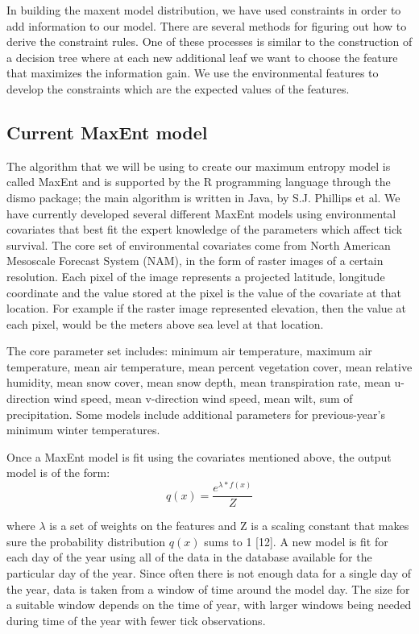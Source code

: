 \noindent In building the maxent model distribution, we have used constraints in order to add information to our model. There are several methods for figuring out how to derive the constraint rules. One of these processes is similar to the construction of a decision tree where at each new additional leaf we want to choose the feature that maximizes the information gain. We use the environmental features to develop the constraints which are the expected values of the features.\newline

\subsection{Current MaxEnt model}

\noindent The algorithm that we will be using to create our maximum entropy model is called MaxEnt and is supported by the R programming language through the dismo package; the main algorithm is written in Java, by S.J. Phillips et al. We have currently developed several different MaxEnt models using environmental covariates that best fit the expert knowledge of the parameters which affect tick survival. The core set of environmental covariates come from North American Mesoscale Forecast System (NAM), in the form of raster images of a certain resolution. Each pixel of the image represents a projected latitude, longitude coordinate and the value stored at the pixel is the value of the covariate at that location. For example if the raster image represented elevation, then the value at each pixel, would be the meters above sea level at that location. \newline

\noindent The core parameter set includes: minimum air temperature, maximum air temperature, mean air temperature, mean percent vegetation cover, mean relative humidity, mean snow cover, mean snow depth, mean transpiration rate, mean u-direction wind speed, mean v-direction wind speed, mean wilt, sum of precipitation. Some models include additional parameters for previous-year's minimum winter temperatures.  \newline

\noindent Once a MaxEnt model is fit using the covariates mentioned above, the output model is of the form:
\begin{equation}
q(x) = \frac{e^{\lambda* f(x)}}{Z}
\end{equation}

\noindent where $\lambda $ is a set of weights on the features and Z is a scaling constant that makes sure the probability distribution $q(x)$ sums to 1 [12]. A new model is fit for each day of the year using all of the data in the database available for the particular day of the year. Since often there is not enough data for a single day of the year, data is taken from a window of time around the model day. The size for a suitable window depends on the time of year, with larger windows being needed during time of the year with fewer tick observations.\newline

